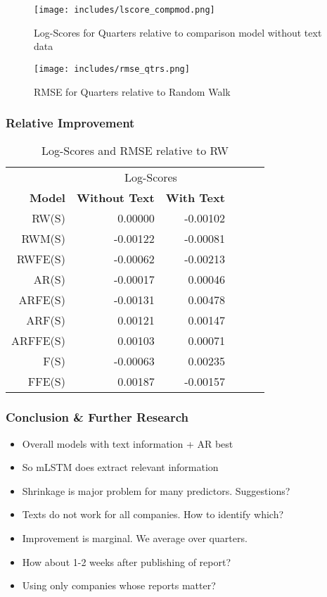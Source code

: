 \documentclass{beamer}
\begin{document}
\begin{frame}[allowframebreaks]
\begin{figure}[ht]
    \centering
    \texttt{[image: includes/lscore\_compmod.png]}
    \caption{Log-Scores for Quarters relative to comparison model without text data}
    \label{fig:lscore_compmod}
\end{figure}

\begin{figure}
    \centering
    \texttt{[image: includes/rmse\_qtrs.png]}
    \caption{RMSE for Quarters relative to Random Walk}
    \label{fig:rmse_qtrs}
\end{figure}
\end{frame}

\begin{frame}
  \frametitle{Relative Improvement}
  \begin{table}[ht]
\centering
\begin{tabular}{rrrrrr}
  \hline
  & \multicolumn{2}{c}{Log-Scores} & &  \\
    \cline{2-3} \cline{5-6}
 \textbf{Model} & \textbf{Without Text}&  \textbf{With Text} \\ \hline
  RW(S)     & 0.00000   & -0.00102 \\
  RWM(S)    & -0.00122  & -0.00081  \\  
  RWFE(S)   & -0.00062  & -0.00213    \\
  AR(S)     & -0.00017  & 0.00046   \\
  ARFE(S)   & -0.00131  & 0.00478   \\
  ARF(S)    & 0.00121   & 0.00147   \\
  ARFFE(S)  & 0.00103   & 0.00071   \\
  F(S)      & -0.00063  & 0.00235   \\
  FFE(S)    & 0.00187   & -0.00157   \\
   \hline
\end{tabular}
\caption{Log-Scores and RMSE relative to RW} 
\label{tab:results}
\end{table}
\end{frame}

\begin{frame}
  \frametitle{Conclusion \& Further Research}
  \begin{itemize}
  \item Overall models with text information + AR best
  \item So mLSTM does extract relevant information
  \item Shrinkage is major problem for many predictors. Suggestions?
  \item Texts do not work for all companies. How to identify which?
  \item Improvement is marginal. We average over quarters.
  \item How about 1-2 weeks after publishing of report?
  \item Using only companies whose reports matter?
  \end{itemize}
\end{frame}

\begin{frame}[allowframebreaks]
  \printbibliography
\end{frame}
\end{document}
